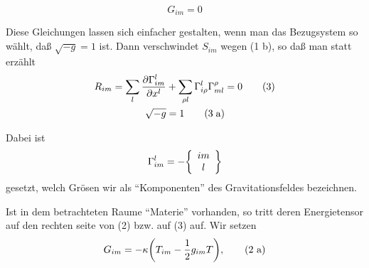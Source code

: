 \documentclass[10pt]{article}
\begin{document}
\begin{equation}
G_{im} = 0 \tag{2}
\end{equation}

Diese Gleichungen lassen sich einfacher gestalten, wenn man das Bezugsystem so w\"{a}hlt, da{\ss} $\sqrt{-g} =1$ ist. Dann verschwindet $S_{im}$ wegen (1 b), so da{\ss} man statt erz\"{a}hlt
\begin{align}
R_{im} = \sum_{l} \pdv{\Gamma^{l}_{im}}{x^l} &+ \sum_{\rho l} \Gamma^l_{i\rho} \Gamma^\rho_{ml} = 0 \tag{3} \\
\sqrt{-g} &= 1 \tag{3\;a}
\end{align}

Dabei ist
\begin{equation}
\Gamma^{l}_{im} = - \qty{\begin{array}{cc} im \\ l \end{array}}
\end{equation}
gesetzt, welch Gr\"{o}sen wir als ``Komponenten'' des Gravitationsfeldes bezeichnen.

Ist in dem betrachteten Raume ``Materie'' vorhanden, so tritt deren Energietensor auf den rechten seite von (2) bzw. auf (3) auf. Wir setzen
\begin{equation}
G_{im} = -\kappa\qty(T_{im} - \frac{1}{2}g_{im}T), \tag{2 a}
\end{equation}
\end{document}
